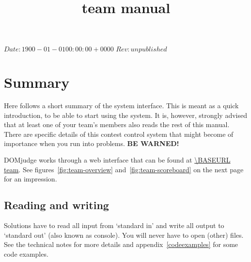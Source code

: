 

\usepackage[english]{babel}
\usepackage{minted}

\SVN $Date: 1900-01-01 00:00:00 +0000 $
\SVN $Rev: unpublished $

\title{\DOMjudge team manual}




\titlestuff{\DOMJUDGEVERSION}{\SVNRev}{\SVNDate}{\today}

\section*{Summary}

Here follows a short summary of the system interface. This is meant as
a quick introduction, to be able to start using the system. It is,
however, strongly advised that at least one of your team's members
also reads the rest of this manual. There are specific details of this
contest control system that might become of importance when you run into
problems. \textbf{BE WARNED!}

DOMjudge works through a web interface that can be found at
\url{\BASEURL team}. See figures~\ref{fig:team-overview}
and~\ref{fig:team-scoreboard} on the next page for an impression.

\subsection*{Reading and writing}

Solutions have to read all input from `standard in' and write all
output to `standard out' (also known as console). You will never have
to open (other) files. See the technical notes for more details and
appendix~\ref{codeexamples} for some code examples.

